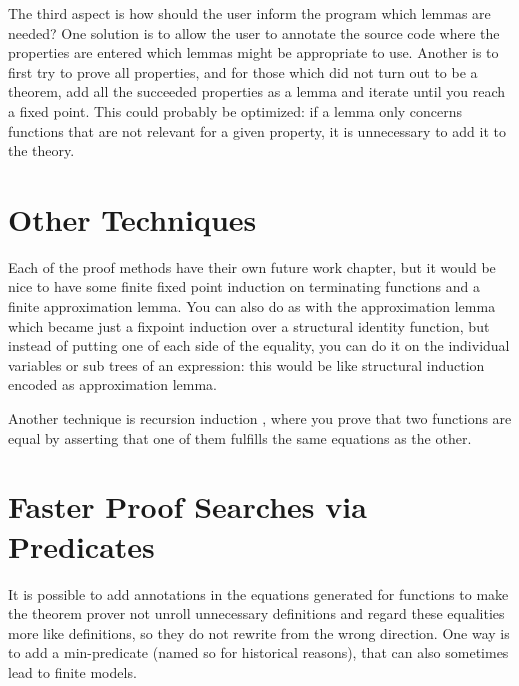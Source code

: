 The third aspect is how should the user inform the program which
lemmas are needed? One solution is to allow the user to annotate the
source code where the properties are entered which lemmas might be
appropriate to use. Another is to first try to prove all properties,
and for those which did not turn out to be a theorem, add all the
succeeded properties as a lemma and iterate until you reach a fixed
point. This could probably be optimized: if a lemma only concerns
functions that are not relevant for a given property, it is
unnecessary to add it to the theory.

%

%

\section{Other Techniques}

Each of the proof methods have their own future work chapter, but it
would be nice to have some finite fixed point induction on terminating
functions and a finite approximation lemma. You can also do as with
the approximation lemma which became just a fixpoint induction over a
structural identity function, but instead of putting one of each side
of the equality, you can do it on the individual variables or sub
trees of an expression: this would be like structural induction
encoded as approximation lemma.

Another technique is recursion induction \cite{recind}, where you
prove that two functions are equal by asserting that one of them
fulfills the same equations as the other.

\section{Faster Proof Searches via Predicates}

It is possible to add annotations in the equations generated for
functions to make the theorem prover not unroll unnecessary
definitions and regard these equalities more like definitions, so they
do not rewrite from the wrong direction. One way is to add a
min-predicate (named so for historical reasons), that can also
sometimes lead to finite models.

